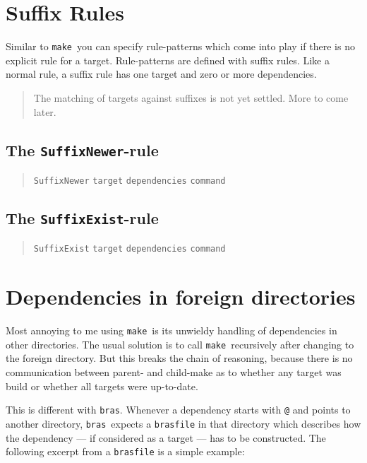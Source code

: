 \documentclass[12pt]{article}
\newcommand{\bras}{\texttt{bras}}
\newcommand{\make}{\texttt{make}}
\begin{document}
\section{Suffix Rules}
Similar to \make\, you can specify rule-patterns which come into play
if there is no explicit rule for a target. Rule-patterns are defined
with suffix rules. Like a normal rule, a suffix rule has one target
and zero or more dependencies. 

\begin{quote}\sffamily
The matching of targets against suffixes is not yet settled. More to
come later.
\end{quote}

\subsection{The \texttt{SuffixNewer}-rule}

\begin{quote}
   \texttt{SuffixNewer} \texttt{target} \texttt{dependencies}
   \texttt{command}
\end{quote}


\subsection{The \texttt{SuffixExist}-rule}

\begin{quote}
   \texttt{SuffixExist} \texttt{target} \texttt{dependencies}
   \texttt{command}
\end{quote}


\section{Dependencies in foreign directories}

Most annoying to me using \make\ is its unwieldy handling of
dependencies in other directories. The usual solution is to call
\make\ recursively after changing to the foreign directory. But this
breaks the chain of reasoning, because there is no communication
between parent- and child-make as to whether any target was build or
whether all targets were up-to-date.

This is different with \bras. Whenever a dependency starts with
\texttt{@} and points to another directory, \bras\ expects
a \texttt{brasfile} in that directory which describes how the
dependency --- if considered as a target --- has to be constructed.
The following excerpt from a \texttt{brasfile} is a simple example:
\end{document}
